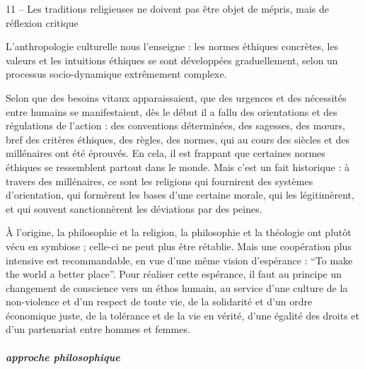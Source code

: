 \begin{singlequote}
        11 – Les traditions religieuses ne doivent pas être objet de mépris, mais de réflexion critique

        L’anthropologie culturelle nous l’enseigne : les normes éthiques concrètes, les valeurs et les intuitions éthiques se sont développées graduellement, selon un processus socio-dynamique extrêmement complexe.

        Selon que des besoins vitaux apparaissaient, que des urgences et des nécessités entre humains se manifestaient, dès le début il a fallu des orientations et des régulations de l’action : des conventions déterminées, des sagesses, des mœurs, bref des critères éthiques, des règles, des normes, qui au cours des siècles et des millénaires ont été éprouvés. En cela, il est frappant que certaines normes éthiques se ressemblent partout dans le monde. Mais c’est un fait historique : à travers des millénaires, ce sont les religions qui fournirent des systèmes d’orientation, qui formèrent les bases d’une certaine morale, qui les légitimèrent, et qui souvent sanctionnèrent les déviations par des peines.

        À l’origine, la philosophie et la religion, la philosophie et la théologie ont plutôt vécu en symbiose ; celle-ci ne peut plus être rétablie. Mais une coopération plus intensive est recommandable, en vue d’une même vision d’espérance : “To make the world a better place”. Pour réaliser cette espérance, il faut au principe un changement de conscience vers un éthos humain, au service d’une culture de la non-violence et d’un respect de toute vie, de la solidarité et d’un ordre économique juste, de la tolérance et de la vie en vérité, d’une égalité des droits et d’un partenariat entre hommes et femmes.
\end{singlequote}

\subparagraph{approche philosophique}        

